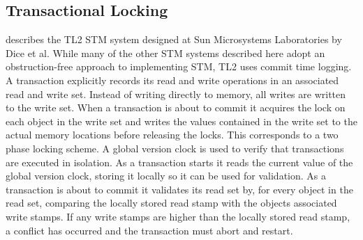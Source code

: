 \subsection{Transactional Locking }
\cite{dice2006transactional} describes the TL2 \ac{STM} system designed at Sun Microsystems Laboratories by Dice et al. While many of the other \ac{STM} systems described here adopt an obstruction-free approach to implementing \ac{STM}, TL2 uses commit time logging\cite[p. 199]{dice2006transactional}. A transaction explicitly records its read and write operations in an associated read and write set\cite[p. 198]{dice2006transactional}. Instead of writing directly to memory, all writes are written to the write set. When a transaction is about to commit it acquires the lock on each object in the write set and writes the values contained in the write set to the actual memory locations before releasing the locks\cite[p. 200]{dice2006transactional}. This corresponds to a two phase locking scheme\cite[p. 455]{tanenbaum2008modern}. A global version clock is used to verify that transactions are executed in isolation\cite[p. 201]{dice2006transactional}. As a transaction starts it reads the current value of the global version clock, storing it locally so it can be used for validation. As a transaction is about to commit it validates its read set by, for every object in the read set, comparing the locally stored read stamp with the objects associated write stamps\cite[p. 200]{dice2006transactional}. If any write stamps are higher than the locally stored read stamp, a conflict has occurred and the transaction must abort and restart. 


